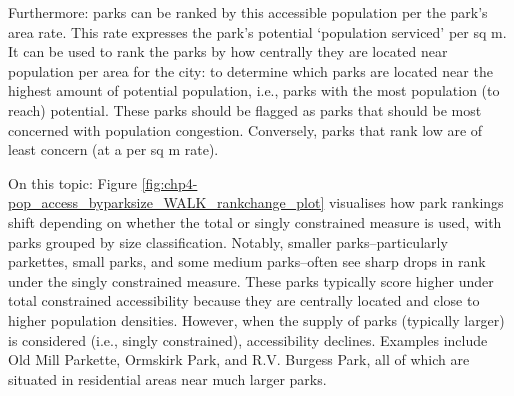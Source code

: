 \documentclass[
11pt, %
oneside, %
english, %
singlespacing, %
]{macthesis} %
\begin{document}
Furthermore: parks can be ranked by this accessible population per the park's area rate. This rate expresses the park's potential `population serviced' per sq m. It can be used to rank the parks by how centrally they are located near population per area for the city: to determine which parks are located near the highest amount of potential population, i.e., parks with the most population (to reach) potential. These parks should be flagged as parks that should be most concerned with population congestion. Conversely, parks that rank low are of least concern (at a per sq m rate).

On this topic: Figure \ref{fig:chp4-pop_access_byparksize_WALK_rankchange_plot} visualises how park rankings shift depending on whether the total or singly constrained measure is used, with parks grouped by size classification. Notably, smaller parks--particularly parkettes, small parks, and some medium parks--often see sharp drops in rank under the singly constrained measure. These parks typically score higher under total constrained accessibility because they are centrally located and close to higher population densities. However, when the supply of parks (typically larger) is considered (i.e., singly constrained), accessibility declines. Examples include Old Mill Parkette, Ormskirk Park, and R.V. Burgess Park, all of which are situated in residential areas near much larger parks.
\end{document}
